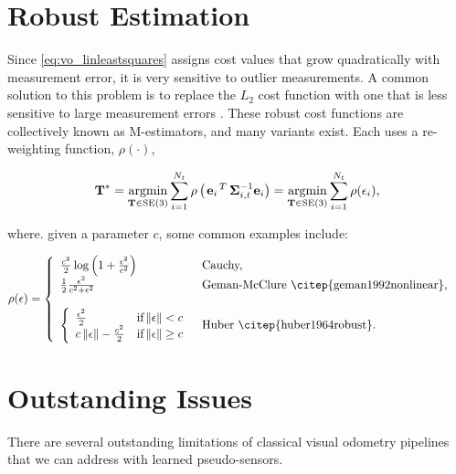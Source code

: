 \section{Robust Estimation}
Since \cref{eq:vo_linleastsquares} assigns cost values that grow quadratically with measurement error, it is very sensitive to outlier measurements.
A common solution to this problem is to replace the $L_2$ cost function with one that is less sensitive to large measurement errors \citep{MacTavish2015-wt}.
These robust cost functions are collectively known as M-estimators, and many variants exist. Each uses a re-weighting function, $\rho(\cdot)$,

\begin{equation}
  \boldsymbol{\mathbf{T}}^* = \operatorname*{argmin}_{\boldsymbol{\mathbf{T}}\in\text{SE}(3)}\sum_{i=1}^{N_t} 
  \rho\left(\left.{\boldsymbol{\mathbf{e}}_{i}}\right.^T \boldsymbol{\mathbf{\Sigma}}_{i,t}^{-1} \boldsymbol{\mathbf{e}}_{i}\right) = \operatorname*{argmin}_{\boldsymbol{\mathbf{T}}\in\text{SE}(3)}\sum_{i=1}^{N_t} 
  \rho(\epsilon_i),
\end{equation}

where. given a parameter $c$, some common examples include:

\begin{align}
\rho(\epsilon) &= \left\{  	\begin{array}{ll}
		 \frac{c^2}{2} \log{\left(1 + \frac{\epsilon^2}{c^2}\right)}   & \mbox{Cauchy,} \\
		 \frac{1}{2} \frac{\epsilon^2}{c^2 + \epsilon^2}  & \mbox{Geman-McClure \citep{geman1992nonlinear},} \\
		 \\
		\left\{  	\begin{array}{ll}  \frac{\epsilon^2}{2} & \mbox{if} \Norm{\epsilon} < c \\
										c\Norm{\epsilon} - \frac{c^2}{2} & \mbox{if} \Norm{\epsilon} \geq c \end{array}
																						 \right.   & \mbox{Huber \citep{huber1964robust}.} \\
	\end{array}
	\right.
\end{align}




\section{Outstanding Issues}
There are several outstanding limitations of classical visual odometry pipelines that we can address with learned pseudo-sensors. 

